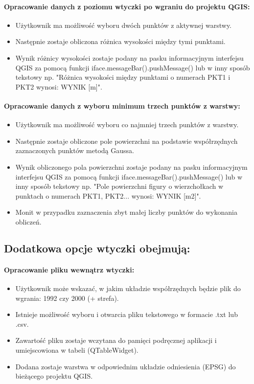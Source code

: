 \documentclass[a4paper,titleauthor]{mwart}
\begin{document}
        \paragraph{Opracowanie danych z poziomu wtyczki po wgraniu do projektu QGIS:}
        \begin{itemize}
            \item Użytkownik ma możliwość wyboru dwóch punktów z aktywnej warstwy.
            \item Następnie zostaje obliczona różnica wysokości między tymi punktami.
            \item Wynik różnicy wysokości zostaje podany na pasku informacyjnym interfejsu QGIS za pomocą funkcji iface.messageBar().pushMessage() lub w inny sposób tekstowy np. "Różnica wysokości między punktami o numerach PKT1 i PKT2 wynosi: WYNIK [m]".
        \end{itemize}

        \paragraph{Opracowanie danych z wyboru minimum trzech punktów z warstwy:}
        \begin{itemize}
            \item Użytkownik ma możliwość wyboru co najmniej trzech punktów z warstwy.
            \item Następnie zostaje obliczone pole powierzchni na podstawie współrzędnych zaznaczonych punktów metodą Gaussa.
            \item Wynik obliczonego pola powierzchni zostaje podany na pasku informacyjnym interfejsu QGIS za pomocą funkcji iface.messageBar().pushMessage() lub w inny sposób tekstowy np. "Pole powierzchni figury o wierzchołkach w punktach o numerach PKT1, PKT2... wynosi: WYNIK [m2]".
            \item Monit w przypadku zaznaczenia zbyt małej liczby punktów do wykonania obliczeń.
        \end{itemize}

       

    \subsection{Dodatkowa opcje wtyczki obejmują:}
        \paragraph{Opracowanie pliku wewnątrz wtyczki:}
        \begin{itemize}
            \item Użytkownik może wskazać, w jakim układzie współrzędnych będzie plik do wgrania: 1992 czy 2000 (+ strefa).
            \item Istnieje możliwość wyboru i otwarcia pliku tekstowego w formacie .txt lub .csv.
            \item Zawartość pliku zostaje wczytana do pamięci podręcznej aplikacji i umiejscowiona w tabeli (QTableWidget).
            \item Dodana zostaje warstwa w odpowiednim układzie odniesienia (EPSG) do bieżącego projektu QGIS.
        \end{itemize}
\end{document}
